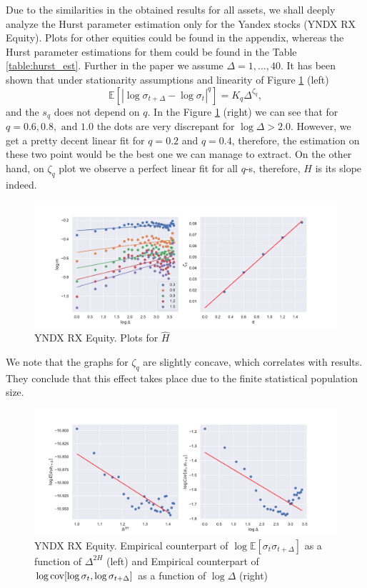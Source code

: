         Due to the similarities in the obtained results for all assets, we shall deeply analyze the Hurst parameter estimation 
        only for the Yandex stocks (YNDX RX Equity). Plots for other equities could be found in the appendix, whereas the Hurst 
        parameter estimations for them could be found in the Table \ref{table:hurst_est}. Further in the paper we assume 
        $\Delta = 1, \dots, 40$. 
        It has been shown that under stationarity assumptions and linearity of Figure \ref{fig:logMDelta} (left)
        \begin{equation}
            \mathbb{E}\left[\left|\log\sigma_{t+\Delta} - \log\sigma_{t}\right|^q\right] = K_q \Delta^{\zeta_q},
        \end{equation} 
        and the $s_q$ does not depend on $q$. 
        In the Figure \ref{fig:logMDelta} (right) we can see that for $q = 0.6, 0.8, \text{ and } 1.0$ the dots are very discrepant for $\log\Delta > 2.0$. 
        However, we get a pretty decent linear fit for $q = 0.2$ and $q = 0.4$, therefore, the estimation on these two point would be the best one
        we can manage to extract. On the other hand, on $\zeta_q$ plot we observe a perfect linear fit for all $q$-s, therefore, $H$
        is its slope indeed.
        \begin{figure}[htbp]
            \includegraphics[width=\textwidth]{fig/YNDX RX Equity Hurst Est.pdf}
            \caption{YNDX RX Equity. Plots for $\hat{H}$}
            \label{fig:logMDelta}
        \end{figure}
        We note that the graphs for $\zeta_q$ are slightly concave, which correlates with \cite{GatheralRosenbaum2014} results.
        They conclude that this effect takes place due to the finite statistical population size.
        \begin{figure}
            \includegraphics[width=\textwidth]{fig/YNDX RX Equity logE vs logD.pdf}
            \caption{YNDX RX Equity. Empirical counterpart of $\log\mathbb{E} \left[\sigma_{t}\sigma_{t+\Delta}\right]$ as a function of $\Delta^{2H}$ (left) and Empirical counterpart of $\log\operatorname*{cov} [\log\sigma_{t}, \log\sigma_{t+\Delta}]$ as a function of $\log\Delta$ (right)}
        \end{figure}
